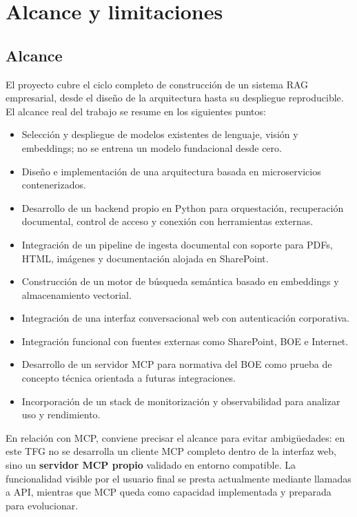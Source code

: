 \section{Alcance y limitaciones}

\subsection{Alcance}

El proyecto cubre el ciclo completo de construcción de un sistema RAG empresarial, desde el diseño de la arquitectura hasta su despliegue reproducible. El alcance real del trabajo se resume en los siguientes puntos:

\begin{itemize}
    \item Selección y despliegue de modelos existentes de lenguaje, visión y embeddings; no se entrena un modelo fundacional desde cero.
    \item Diseño e implementación de una arquitectura basada en microservicios contenerizados.
    \item Desarrollo de un backend propio en Python para orquestación, recuperación documental, control de acceso y conexión con herramientas externas.
    \item Integración de un pipeline de ingesta documental con soporte para PDFs, HTML, imágenes y documentación alojada en SharePoint.
    \item Construcción de un motor de búsqueda semántica basado en embeddings y almacenamiento vectorial.
    \item Integración de una interfaz conversacional web con autenticación corporativa.
    \item Integración funcional con fuentes externas como SharePoint, BOE e Internet.
    \item Desarrollo de un servidor MCP para normativa del BOE como prueba de concepto técnica orientada a futuras integraciones.
    \item Incorporación de un stack de monitorización y observabilidad para analizar uso y rendimiento.
\end{itemize}

En relación con MCP, conviene precisar el alcance para evitar ambigüedades: en este TFG no se desarrolla un cliente MCP completo dentro de la interfaz web, sino un \textbf{servidor MCP propio} validado en entorno compatible. La funcionalidad visible por el usuario final se presta actualmente mediante llamadas a API, mientras que MCP queda como capacidad implementada y preparada para evolucionar.

